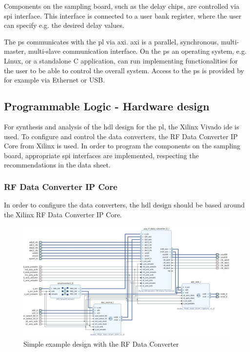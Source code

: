 Components on the sampling board, such as the delay chips, are controlled via \gls{spi} interface. 
This interface is connected to a user bank register, where the user can specify e.g. the desired delay values.

The \gls{ps} communicates with the \gls{pl} via \gls{axi}.
\gls{axi} is a parallel, synchronous, multi-master, multi-slave communication interface.
On the \gls{ps} an operating system, e.g. Linux, or a standalone C application, can run implementing functionalities for the user to be able to control the overall system.
Access to the \gls{ps} is provided by for example via Ethernet or USB.


\subsection{Programmable Logic - Hardware design}
For synthesis and analysis of the \gls{hdl} design for the \gls{pl}, the Xilinx Vivado \gls{ide} is used.
To configure and control the data converters, the RF Data Converter IP Core from Xilinx is used.
In order to program the components on the sampling board, appropriate \gls{spi} interfaces are implemented, respecting the recommendations in the data sheet.

\subsubsection*{RF Data Converter IP Core}
In order to configure the data converters, the \gls{hdl} design should be based around the Xilinx RF Data Converter IP Core. 

\begin{figure}[tbh]
	\centering
	\includegraphics[width = \textwidth]{chap/04-work/img/rf_data_converter}
	\caption{Simple example design with the RF Data Converter}
	\label{fig:rf_dc_ex}
\end{figure}


